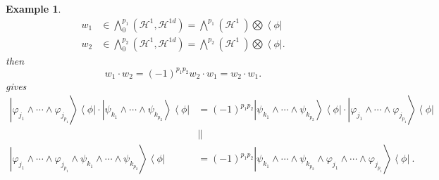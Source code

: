 \documentclass[aps,preprint]{revtex4}%
\newtheorem{example}[theorem]{Example}
\begin{document}
\begin{example}%
\begin{align}
w_{1}  &  \in%
{\textstyle\bigwedge\nolimits_{0}^{p_{1}}}
\left(  \mathcal{H}^{1},\mathcal{H}^{1d}\right)  =%
{\textstyle\bigwedge\nolimits^{p_{1}}}
\left(  \mathcal{H}^{1}\ \right)
{\textstyle\bigotimes}
\left\langle \phi\right\vert \\
w_{2}  &  \in%
{\textstyle\bigwedge\nolimits_{0}^{p_{2}}}
\left(  \mathcal{H}^{1},\mathcal{H}^{1d}\right)  =%
{\textstyle\bigwedge\nolimits^{p_{2}}}
\left(  \mathcal{H}^{1}\ \right)
{\textstyle\bigotimes}
\left\langle \phi\right\vert .
\end{align}
then
\begin{equation}
w_{1}\cdot w_{2}=\left(  -1\right)  ^{p_{1}p_{2}}w_{2}\cdot w_{1}=w_{2}\cdot
w_{1}.
\end{equation}
gives
\begin{align}
\left\vert \varphi_{j_{1}}\wedge\cdots\wedge\varphi_{j_{p_{1}}}\right\rangle
\left\langle \phi\right\vert \cdot\left\vert \psi_{k_{1}}\wedge\cdots
\wedge\psi_{k_{p_{2}}}\right\rangle \left\langle \phi\right\vert  &  =\left(
-1\right)  ^{p_{1}p_{2}}\left\vert \psi_{k_{1}}\wedge\cdots\wedge
\psi_{k_{p_{2}}}\right\rangle \left\langle \phi\right\vert \cdot\left\vert
\varphi_{j_{1}}\wedge\cdots\wedge\varphi_{j_{p_{1}}}\right\rangle \left\langle
\phi\right\vert \\
&  \parallel\\
\left\vert \varphi_{j_{1}}\wedge\cdots\wedge\varphi_{j_{p_{1}}}\wedge
\psi_{k_{1}}\wedge\cdots\wedge\psi_{k_{p_{2}}}\right\rangle \left\langle
\phi\right\vert  &  =\left(  -1\right)  ^{p_{1}p_{2}}\left\vert \psi_{k_{1}%
}\wedge\cdots\wedge\psi_{k_{p_{2}}}\wedge\varphi_{j_{1}}\wedge\cdots
\wedge\varphi_{j_{p_{1}}}\right\rangle \left\langle \phi\right\vert \ .
\end{align}

\end{example}
\end{document}

